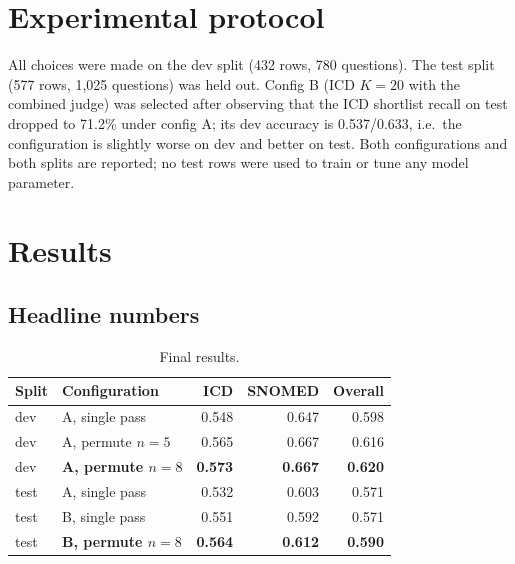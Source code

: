 \documentclass[11pt]{article}
\begin{document}
\section{Experimental protocol}
All choices were made on the dev split (432 rows, 780 questions). The test split
(577 rows, 1{,}025 questions) was held out. Config B (ICD $K{=}20$ with the combined judge)
was selected after observing that the ICD shortlist recall on test dropped to 71.2\% under
config A; its dev accuracy is 0.537/0.633, i.e.\ the configuration is slightly worse on dev
and better on test. Both configurations and both splits are reported; no test rows were used
to train or tune any model parameter.

\section{Results}
\subsection{Headline numbers}
\begin{table}[H]
\centering
\small
\begin{tabular}{@{}llrrr@{}}
\toprule
Split & Configuration & ICD & SNOMED & Overall\\
\midrule
dev & A, single pass & 0.548 & 0.647 & 0.598\\
dev & A, permute $n{=}5$ & 0.565 & 0.667 & 0.616\\
dev & \textbf{A, permute $n{=}8$} & \textbf{0.573} & \textbf{0.667} & \textbf{0.620}\\
test & A, single pass & 0.532 & 0.603 & 0.571\\
test & B, single pass & 0.551 & 0.592 & 0.571\\
test & \textbf{B, permute $n{=}8$} & \textbf{0.564} & \textbf{0.612} & \textbf{0.590}\\
\bottomrule
\end{tabular}
\caption{Final results.}
\end{table}
\end{document}

